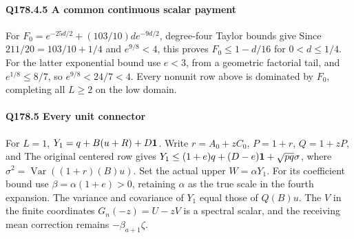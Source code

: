 \paragraph{Q178.4.5 A common continuous scalar payment}
For $F_0=\allowbreak e^{-25d/2}+(103/10)de^{-9d/2}$, degree-four Taylor bounds give
Since $211/20=\allowbreak 103/10+1/4$ and $e^{9/8}<\allowbreak 4$, this proves
$F_0\le\allowbreak 1-d/16$ for $0<\allowbreak d\le\allowbreak 1/4$.
For the latter exponential bound use $e<\allowbreak 3$, from a geometric factorial
tail, and $e^{1/8}\le\allowbreak 8/7$, so $e^{9/8}<\allowbreak 24/7<\allowbreak 4$.
Every nonunit row above is dominated by $F_0$, completing all $L\ge\allowbreak 2$
on the low domain.

\paragraph{Q178.5 Every unit connector}\label{part:Q178.5}
For $L=\allowbreak 1$, $Y_1=\allowbreak q+B(u+R)+D\mathbf1$.
Write $r=\allowbreak A_0+zC_0$, $P=\allowbreak 1+r$, $Q=\allowbreak 1+zP$, and
The original centered row gives
$Y_1\le\allowbreak (1+e)q+(D-e)\mathbf1+\sqrt{pq}\sigma$,
where $\sigma^2=\allowbreak \operatorname{Var}((1+r)(B)u)$.
Set the actual upper $W=\allowbreak \alpha Y_1$.
For its coefficient bound use $\beta=\allowbreak \alpha(1+e)>\allowbreak 0$, retaining
$\alpha$ as the true scale in the fourth expansion.
The variance and covariance of $Y_1$ equal those of $Q(B)u$.
The $V$ in the finite coordinates $G_n(-z)=\allowbreak U-zV$ is a spectral scalar,
and the receiving mean correction remains $-\beta_{a+1}\zeta$.

